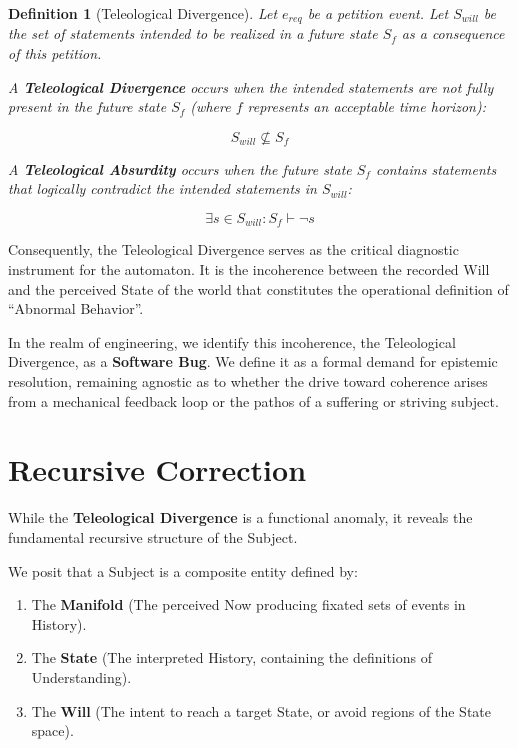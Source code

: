 \documentclass[11pt, a4paper]{article}
\theoremstyle{formalism}
\newtheorem{formalism}{Definition}
\begin{document}
{\begin{formalism}[Teleological Divergence]

    Let $e_{req}$ be a petition event. Let $S_{will}$ be the set of statements
    intended to be realized in a future state $S_f$ as a consequence of this
    petition.
    
    A \textbf{Teleological Divergence} occurs when the intended statements are
    not fully present in the future state $S_f$ (where $f$ represents an
    acceptable time horizon):

    \begin{equation}
        S_{will} \not\subseteq S_f
    \end{equation}

    A \textbf{Teleological Absurdity} occurs when the future state $S_f$
    contains statements that logically contradict the intended statements in
    $S_{will}$:

    \begin{equation}
        \exists s \in S_{will} : S_f \vdash \neg s
    \end{equation}
\end{formalism}

Consequently, the Teleological Divergence serves as the critical diagnostic
instrument for the automaton. It is the incoherence between the recorded Will
and the perceived State of the world that constitutes the operational
definition of ``Abnormal Behavior''.

In the realm of engineering, we identify this incoherence, the Teleological
Divergence, as a \textbf{Software Bug}. We define it as a formal demand for
epistemic resolution, remaining agnostic as to whether the drive toward
coherence arises from a mechanical feedback loop or the pathos of a suffering 
or striving subject.

\section{Recursive Correction}

While the \textbf{Teleological Divergence} is a functional anomaly, it reveals 
the fundamental recursive structure of the Subject. 

We posit that a Subject is a composite entity defined by:
\begin{enumerate}
    \item The \textbf{Manifold} (The perceived Now producing fixated sets of events in History).
    \item The \textbf{State} (The interpreted History, containing the definitions of Understanding).
    \item The \textbf{Will} (The intent to reach a target State, or avoid regions of the State space).
\end{enumerate}

}
\end{document}
